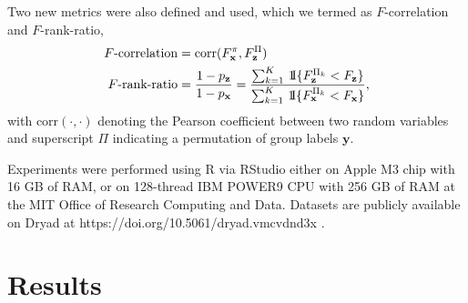 \documentclass[10pt,letterpaper]{article}
\newcommand{\1}{{\rm 1}\kern-0.24em{\rm I}}
\begin{document}
Two new metrics were also defined and used, which we termed as $F$-correlation and $F$-rank-ratio,
\begin{equation}
\begin{aligned}
    F\text{-correlation} &= \text{corr}(F_\mathbf{x}^\pi, F_\mathbf{z}^\Pi) \\
    F\text{-rank-ratio} &= \frac{1-p_\mathbf{z}}{1-p_\mathbf{x}} = \frac{\sum_{k=1}^K\,\1\{F_\mathbf{z}^{\Pi_k} < F_\mathbf{z}\}}{\sum_{k=1}^K\,\1\{F_\mathbf{x}^{\Pi_k} < F_\mathbf{x}\}},
    \label{eq:def_f_metrics}
\end{aligned}
\end{equation}
with $\text{corr}(\cdot,\cdot)$ denoting the Pearson coefficient between two random variables and superscript $\Pi$ indicating a permutation of group labels $\mathbf{y}$.

Experiments were performed using R via RStudio either on Apple M3 chip with 16 GB of RAM, or on 128-thread IBM POWER9 CPU with 256 GB of RAM at the MIT Office of Research Computing and Data. Datasets are publicly available on Dryad at https://doi.org/10.5061/dryad.vmcvdnd3x \cite{Kim25}.



\section*{Results}
\end{document}
